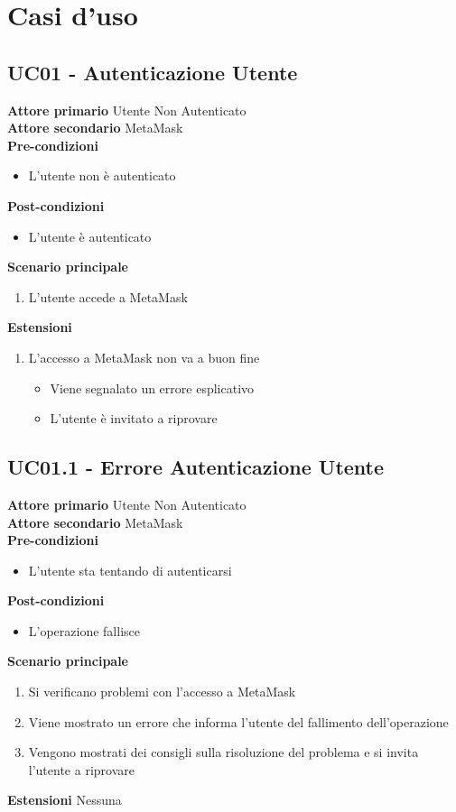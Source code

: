 \section{Casi d'uso}

\subsection{UC01 - Autenticazione Utente}
\textbf{Attore primario} Utente Non Autenticato \\
\textbf{Attore secondario} MetaMask \\
\textbf{Pre-condizioni}
\begin{itemize}
    \item L'utente non è autenticato
\end{itemize}
\textbf{Post-condizioni}
\begin{itemize}
    \item L'utente è autenticato
\end{itemize}
\textbf{Scenario principale}
\begin{enumerate}
    \item L'utente accede a MetaMask
\end{enumerate}
\textbf{Estensioni}
\begin{enumerate}
    \item L'accesso a MetaMask non va a buon fine
          \begin{itemize}
              \item Viene segnalato un errore esplicativo
              \item L'utente è invitato a riprovare
          \end{itemize}
\end{enumerate}

\subsection{UC01.1 - Errore Autenticazione Utente}
\textbf{Attore primario} Utente Non Autenticato \\
\textbf{Attore secondario} MetaMask \\
\textbf{Pre-condizioni}
\begin{itemize}
    \item L'utente sta tentando di autenticarsi
\end{itemize}
\textbf{Post-condizioni}
\begin{itemize}
    \item L'operazione fallisce
\end{itemize}
\textbf{Scenario principale}
\begin{enumerate}
    \item Si verificano problemi con l'accesso a MetaMask
    \item Viene mostrato un errore che informa l'utente del fallimento dell'operazione
    \item Vengono mostrati dei consigli sulla risoluzione del problema e si invita
          l'utente a riprovare
\end{enumerate}
\textbf{Estensioni} Nessuna

